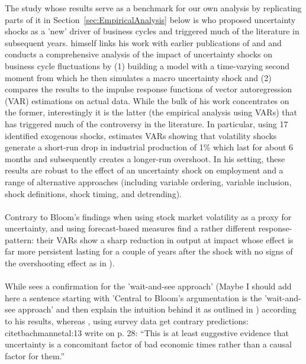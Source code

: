 \documentclass[a4paper,12pt,oneside,pointednumbers,bibtotoc,bigheadings,liststotoc]{scrbook}
\begin{document}
The study whose results serve as a benchmark for our own analysis by replicating parts of it in Section~\ref{sec:EmpiricalAnalysis} below is \citet{bloom:09} who proposed uncertainty shocks as a 'new' driver of business cycles and triggered much of the literature in subsequent years. \citet{bloom:09} himself links his work with earlier publications of \citet{bernanke:83} and \citet{hassler:96} and conducts a comprehensive analysis of the impact of uncertainty shocks on business cycle fluctuations by (1) building a model with a time-varying second moment from which he then simulates a macro uncertainty shock and (2) compares the results to the impulse response functions of vector autoregression (VAR) estimations on actual data. While the bulk of his work concentrates on the former, interestingly it is the latter (the empirical analysis using VARs) that has triggered much of the controversy in the literature. In particular, using 17 identified exogenous shocks, \citet{bloom:09} estimates VARs showing that volatility shocks generate a short-run drop in industrial production of 1\% which last for about 6 months and subsequently creates a longer-run overshoot. In his setting, these results are robust to the effect of an uncertainty shock on employment and a range of alternative approaches (including variable ordering, variable inclusion, shock definitions, shock timing, and detrending).\\
\\
Contrary to Bloom's findings when using stock market volatility as a proxy for uncertainty, \citet{juradoetal:15} and \citet{bachmannetal:13} using forecast-based measures find a rather different response-pattern: their VARs show a sharp reduction in output at impact whose effect is far more persistent lasting for a couple of years after the shock with no signs of the overshooting effect as in \citealp{bloom:09}).\\
\\
While \citet{bloom:09} sees a confirmation for the 'wait-and-see approach' (Maybe I should add here a sentence starting with 'Central to Bloom's argumentation is the 'wait-and-see approach' and then explain the intuition behind it as outlined in \citet{bachmannetal:13}) according to his results, whereas \citet{bachmannetal:13}, using survey data get contrary predictions: 
\\
citet{bachmannetal:13} write on p. 28: ``This is at least suggestive evidence that uncertainty is a concomitant factor of bad economic times rather than a causal factor for them.''
\end{document}
